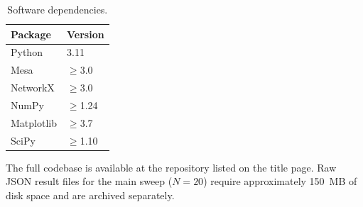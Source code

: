 \begin{table}[h]
\centering
\caption{Software dependencies.}
\label{tab:S9}
\begin{tabular}{ll}
\toprule
Package & Version \\
\midrule
Python     & 3.11 \\
Mesa       & $\geq$3.0 \\
NetworkX   & $\geq$3.0 \\
NumPy      & $\geq$1.24 \\
Matplotlib & $\geq$3.7 \\
SciPy      & $\geq$1.10 \\
\bottomrule
\end{tabular}
\end{table}

The full codebase is available at the repository listed on the title page.
Raw JSON result files for the main sweep ($N=20$) require approximately 150~MB
of disk space and are archived separately.
